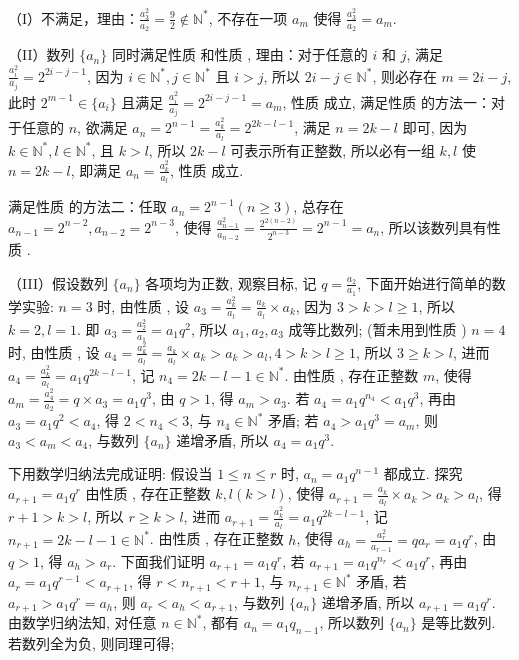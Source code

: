 \begin{solutions}
（I）不满足，理由：$\displaystyle \frac{a_3^2}{a_2} = \frac{9}{2} \notin \mathbb{N}^*$, 不存在一项 $a_m$ 使得 $\displaystyle \frac{a_3^2}{a_2} = a_m$.

（II）数列 $\{a_n\}$ 同时满足性质  和性质 ,
理由：对于任意的 $i$ 和 $j$, 满足 $\displaystyle \frac{a_i^2}{a_j} = 2^{2i-j-1}$, 因为 $i \in \mathbb{N}^*, j \in \mathbb{N}^*$ 且 $i > j$, 所以 $2i - j \in \mathbb{N}^*$, 则必存在 $m = 2i - j$, 此时 $2^{m-1} \in \{a_i\}$ 且满足 $\displaystyle \frac{a_i^2}{a_j} = 2^{2i-j-1} = a_m$, 性质  成立,
满足性质  的方法一：对于任意的 $n$, 欲满足 $\displaystyle a_n = 2^{n-1} = \frac{a_k^2}{a_l} = 2^{2k-l-1}$, 满足 $n = 2k - l$ 即可,
因为 $k \in \mathbb{N}^*, l \in \mathbb{N}^*$, 且 $k > l$, 所以 $2k - l$ 可表示所有正整数,
所以必有一组 $k, l$ 使 $n = 2k - l$, 即满足 $\displaystyle a_n = \frac{a_k^2}{a_l}$, 性质  成立.

满足性质  的方法二：任取 $a_n = 2^{n-1} (n \geqslant 3)$, 总存在 $a_{n-1} = 2^{n-2}, a_{n-2} = 2^{n-3}$,
使得 $\displaystyle \frac{a_{n-1}^2}{a_{n-2}} = \frac{2^{2(n-2)}}{2^{n-3}} = 2^{n-1} = a_n$, 所以该数列具有性质 .

（III）假设数列 $\{a_n\}$ 各项均为正数, 观察目标, 记 $\displaystyle q = \frac{a_2}{a_1}$, 下面开始进行简单的数学实验:
$n = 3$ 时, 由性质 , 设 $\displaystyle a_3 = \frac{a_k^2}{a_l} = \frac{a_k}{a_l} \times a_k$, 因为 $3 > k > l \geqslant 1$, 所以 $k = 2, l = 1$.
即 $\displaystyle a_3 = \frac{a_2^2}{a_1} = a_1 q^2$, 所以 $a_1, a_2, a_3$ 成等比数列; (暂未用到性质 )
$n = 4$ 时, 由性质 , 设 $\displaystyle a_4 = \frac{a_k^2}{a_l} = \frac{a_k}{a_l} \times a_k > a_k > a_l, 4 > k > l \geqslant 1$,
所以 $3 \geqslant k > l$, 进而 $\displaystyle a_4 = \frac{a_k^2}{a_l} = a_1 q^{2k-l-1}$, 记 $n_4 = 2k - l - 1 \in \mathbb{N}^*$.
由性质 , 存在正整数 $m$, 使得 $\displaystyle a_m = \frac{a_4^2}{a_2} = q \times a_3 = a_1 q^3$, 由 $q > 1$, 得 $a_m > a_3$.
若 $a_4 = a_1 q^{n_4} < a_1 q^3$, 再由 $a_3 = a_1 q^2 < a_4$, 得 $2 < n_4 < 3$, 与 $n_4 \in \mathbb{N}^*$ 矛盾;
若 $a_4 > a_1 q^3 = a_m$, 则 $a_3 < a_m < a_4$, 与数列 $\{a_n\}$ 递增矛盾,
所以 $a_4 = a_1 q^3$.

下用数学归纳法完成证明:
假设当 $1 \leqslant n \leqslant r$ 时, $a_n = a_1 q^{n-1}$ 都成立.
探究 $a_{r+1} = a_1 q^r$
由性质 , 存在正整数 $k, l (k > l)$, 使得 $\displaystyle a_{r+1} = \frac{a_k}{a_l} \times a_k > a_k > a_l$, 得 $r + 1 > k > l$,
所以 $r \geqslant k > l$, 进而 $\displaystyle a_{r+1} = \frac{a_k^2}{a_l} = a_1 q^{2k-l-1}$, 记 $n_{r+1} = 2k - l - 1 \in \mathbb{N}^*$.
由性质 , 存在正整数 $h$, 使得 $\displaystyle a_h = \frac{a_r^2}{a_{r-1}} = q a_r = a_1 q^r$, 由 $q > 1$, 得 $a_h > a_r$.
下面我们证明 $a_{r+1} = a_1 q^r$,
若 $a_{r+1} = a_1 q^{n_r} < a_1 q^r$, 再由 $a_r = a_1 q^{r-1} < a_{r+1}$, 得 $r < n_{r+1} < r + 1$, 与 $n_{r+1} \in \mathbb{N}^*$ 矛盾,
若 $a_{r+1} > a_1 q^r = a_h$, 则 $a_r < a_h < a_{r+1}$, 与数列 $\{a_n\}$ 递增矛盾, 所以 $a_{r+1} = a_1 q^r$.
由数学归纳法知, 对任意 $n \in \mathbb{N}^*$, 都有 $a_n = a_1 q_{n-1}$, 所以数列 $\{a_n\}$ 是等比数列.
若数列全为负, 则同理可得;


\end{solutions}
